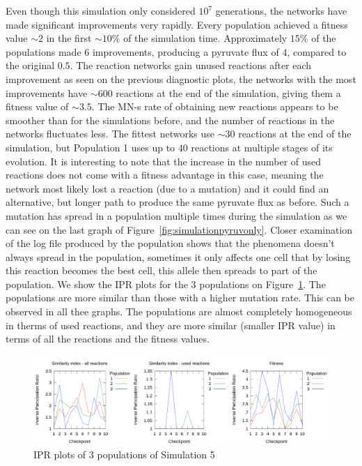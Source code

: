 \documentclass[a4paper,12pt]{article}
\begin{document}
Even though this simulation only considered $10^7$ generations, the networks have made significant improvements very rapidly. Every population achieved a fitness value $\sim 2$ in the first $\sim 10\%$ of the simulation time. Approximately $15\%$ of the populations made $6$ improvements, producing a pyruvate flux of $4$, compared to the original $0.5$. The reaction networks gain unused reactions after each improvement as seen on the previous diagnostic plots, the networks with the most improvements have $\sim 600$ reactions at the end of the simulation, giving them a fitness value of $\sim 3.5$. The MN-s rate of obtaining new reactions appears to be smoother than for the simulations before, and the number of reactions in the networks fluctuates less. The fittest networks use $\sim 30$ reactions at the end of the simulation, but Population 1 uses up to $40$ reactions at multiple stages of its evolution. It is interesting to note that the increase in the number of used reactions does not come with a fitness advantage in this case, meaning the network most likely lost a reaction (due to a mutation) and it could find an alternative, but longer path to produce the same pyruvate flux as before. Such a mutation has spread in a population multiple times during the simulation as we can see on the last graph of Figure~\ref{fig:simulationpyruvonly}. Closer examination of the log file produced by the population shows that the phenomena doesn't always spread in the population, sometimes it only affects one cell that by losing this reaction becomes the best cell, this allele then spreads to part of the population. We show the IPR plots for the $3$ populations on Figure~\ref{fig:iprsim5}. The populations are more similar than those with a higher mutation rate. This can be observed in all thee graphs. The populations are almost completely homogeneous in therms of used reactions, and they are more similar (smaller IPR value) in terms of all the reactions and the fitness values. 

\begin{figure}[htpb]
	\centering
	\includegraphics[width=1\linewidth]{iprsim5.pdf}
	\caption{IPR plots of 3 populations of Simulation 5}
	\label{fig:iprsim5}
\end{figure}
\end{document}
